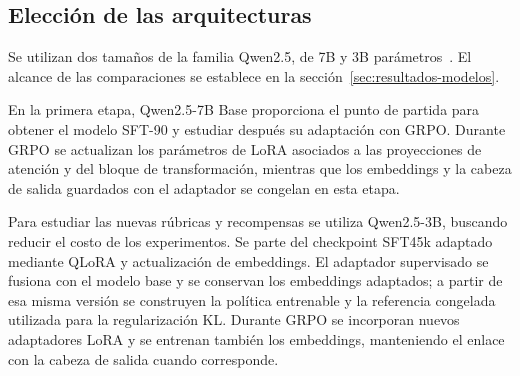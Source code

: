 \subsection{Elección de las arquitecturas}
\label{sec:metodo-arquitecturas}
Se utilizan dos tamaños de la familia Qwen2.5, de 7B y 3B parámetros~\cite{qwen2024qwen25}. El alcance de las comparaciones se establece en la sección~\ref{sec:resultados-modelos}.

En la primera etapa, Qwen2.5-7B Base proporciona el punto de partida para obtener el modelo SFT-90 y estudiar después su adaptación con GRPO. Durante GRPO se actualizan los parámetros de LoRA asociados a las proyecciones de atención y del bloque de transformación, mientras que los embeddings y la cabeza de salida guardados con el adaptador se congelan en esta etapa.

Para estudiar las nuevas rúbricas y recompensas se utiliza Qwen2.5-3B, buscando reducir el costo de los experimentos. Se parte del checkpoint SFT45k adaptado mediante QLoRA y actualización de embeddings. El adaptador supervisado se fusiona con el modelo base y se conservan los embeddings adaptados; a partir de esa misma versión se construyen la política entrenable y la referencia congelada utilizada para la regularización KL. Durante GRPO se incorporan nuevos adaptadores LoRA y se entrenan también los embeddings, manteniendo el enlace con la cabeza de salida cuando corresponde.
